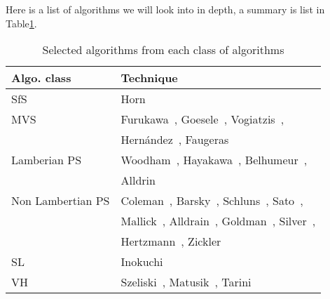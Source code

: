 Here is a list of algorithms we will look into in depth, a summary is list in Table\ref{tab:class_algo}.
\begin{table}[!ht]
  \centering
  \begin{tabular}{l||l}
  \hline
  \textbf{Algo. class} & \textbf{Technique}\\
  \hline
  SfS & Horn~\cite{horn1970shape}\\
  MVS & Furukawa~\cite{furukawa2010accurate}, Goesele~\cite{goesele2006multi}, Vogiatzis~\cite{vogiatzis2007multiview}, \\
      & Hern{\'a}ndez~\cite{esteban2004silhouette}, Faugeras~\cite{faugeras2002variational}\\
  Lamberian PS & Woodham~\cite{woodham1980photometric}, Hayakawa~\cite{hayakawa1994photometric}, Belhumeur~\cite{belhumeur1999bas}, \\
      & Alldrin~\cite{alldrin2007resolving}\\
  Non Lambertian PS & Coleman~\cite{coleman1982obtaining}, Barsky~\cite{barsky20034}, Schluns~\cite{schluns1993photometric}, Sato~\cite{sato1994temporal}, \\
      & Mallick~\cite{mallick2005beyond}, Alldrain~\cite{alldrin2008photometric}, Goldman~\cite{goldman2010shape}, Silver~\cite{silver1980determining}, \\
      & Hertzmann~\cite{hertzmann2005example}, Zickler~\cite{zickler2002helmholtz}\\
  SL & Inokuchi~\cite{inokuchi1984range}\\
  VH & Szeliski~\cite{szeliski1993rapid}, Matusik~\cite{matusik2002efficient}, Tarini~\cite{tarini2002marching}\\
  \hline
  \end{tabular}
  \caption{Selected algorithms from each class of algorithms}
  \label{tab:class_algo}
\end{table}

